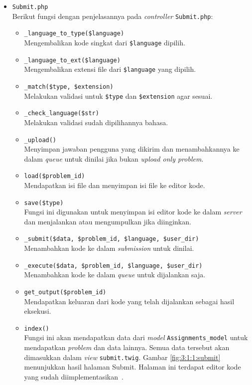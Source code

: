 \begin{itemize}
	\item \verb|Submit.php| \\
	      Berikut fungsi dengan penjelasannya pada \textit{controller} \verb|Submit.php|:

	      \begin{itemize}
		      \item \verb|_language_to_type($language)| \\
		            Mengembalikan kode singkat dari \verb|$language| dipilih.
		      \item \verb|_language_to_ext($language)| \\
		            Mengembalikan extensi file dari \verb|$language| yang dipilih.
		      \item \verb|_match($type, $extension)| \\
		            Melakukan validasi untuk \verb|$type| dan \verb|$extension| agar sesuai.
		      \item \verb|_check_language($str)| \\
		            Melakukan validasi sudah dipilihannya bahasa.
		      \item \verb|_upload()| \\
		            Menyimpan jawaban pengguna yang dikirim dan menambahkannya ke dalam \textit{queue} untuk dinilai jika bukan \textit{upload only problem}.
		      \item \verb|load($problem_id)| \\
		            Mendapatkan isi file dan menyimpan isi file ke editor kode.
		      \item \verb|save($type)| \\
		            Fungsi ini digunakan untuk menyimpan isi editor kode ke dalam \textit{server} dan menjalankan atau mengumpulkan jika diinginkan.
		      \item \verb|_submit($data, $problem_id, $language, $user_dir)| \\
		            Menambahkan kode ke dalam \textit{submission} untuk dinilai.
		      \item \verb|_execute($data, $problem_id, $language, $user_dir)| \\
		            Menambahkan kode ke dalam \textit{queue} untuk dijalankan saja.
		      \item \verb|get_output($problem_id)| \\
		            Mendapatkan keluaran dari kode yang telah dijalankan sebagai hasil eksekusi.
		      \item \verb|index()| \\
		            Fungsi ini akan mendapatkan data dari \textit{model} \verb|Assignments_model| untuk mendapatkan \textit{problem} dan data lainnya. Semua data tersebut akan dimasukkan dalam \textit{view} \verb|submit.twig|. Gambar \ref{fig:3:1:1:submit} menunjukkan hasil halaman Submit. Halaman ini terdapat editor kode yang sudah diimplementasikan~\cite{nicholas:sharif}.


\end{itemize}
\end{itemize}
